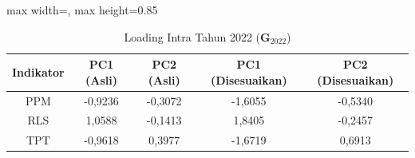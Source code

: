 \begin{table}[H]
\centering
\caption{Loading Intra Tahun 2022 ($\mathbf{G}_{2022}$)} \label{tab:sample2loading_intra_2022}
\begin{adjustbox}{max width=\textwidth, max height=0.85\textheight}
\begin{tabular}{|c|c|c|c|c|}
\hline
\textbf{Indikator} & \textbf{PC1 (Asli)} & \textbf{PC2 (Asli)} & \textbf{PC1 (Disesuaikan)} & \textbf{PC2 (Disesuaikan)} \\
\hline
PPM & -0,9236 & -0,3072 & -1,6055 & -0,5340 \\
RLS & 1,0588 & -0,1413 & 1,8405 & -0,2457 \\
TPT & -0,9618 & 0,3977 & -1,6719 & 0,6913 \\
\hline
\end{tabular}
\end{adjustbox}
\end{table}